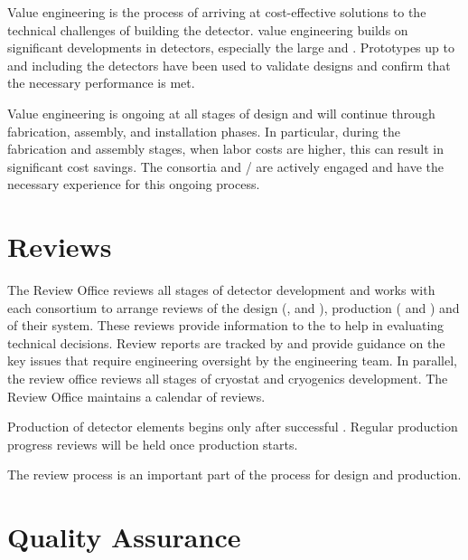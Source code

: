 Value engineering is the process of arriving at cost-effective
solutions to the technical challenges of building the 
detector.  value engineering builds on significant
developments in  detectors,  
especially the large   and
. Prototypes up to and including the  
detectors have been used to validate
 designs and confirm that the necessary performance is
met.

Value engineering is ongoing at all stages of design and will continue
through fabrication, assembly, and installation phases. In
particular, during the fabrication and assembly stages, when labor costs
are higher, this can result in significant cost savings.  The
consortia and / are actively engaged and have the necessary
experience for this ongoing process.

\section{Reviews}
\label{sec:es-tc-reviews}

The   Review Office reviews all stages of
detector development and works with each consortium to arrange reviews
of the design (,  and ), production
( and ) and  of their system. These
reviews provide information to the  to help in evaluating
technical decisions.  Review reports are tracked by  and
provide guidance on the key issues that require engineering oversight
by the  engineering team. In parallel, the review office
reviews all stages of  cryostat and cryogenics
development. The Review Office maintains a calendar of 
reviews.


Production of detector elements begins only after successful
. Regular production progress reviews will be held once
production starts. 

The review process is an important part of the  
process for design and production.

\section{Quality Assurance}
\label{sec:es-tc-qa}

